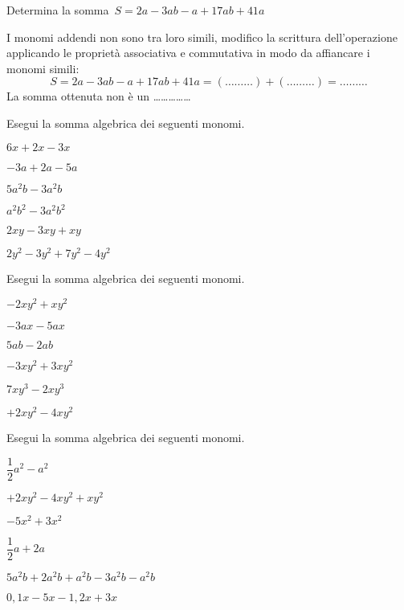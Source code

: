 \begin{esercizio}
 \label{ese:9.25}
Determina la somma~\(S=2a-3ab-a+17ab+41a\)

I monomi addendi non sono tra loro simili, modifico la scrittura
dell'operazione applicando le proprietà associativa e commutativa
in modo da affiancare i monomi simili:
\[
S=2a-3ab-a+17ab+41a=(\ldots\ldots\ldots)+(\ldots\ldots\ldots)=\ldots\ldots\ldots
\]
La somma ottenuta non è un \ldots\ldots\ldots\ldots\ldots
\end{esercizio}

\begin{esercizio}
 \label{ese:9.26}
Esegui la somma algebrica dei seguenti monomi.
\begin{multicols}{3}
\begin{enumeratea}
 \item \(6x+2x-3x\)
 \item \(-3a+2a-5a\)
 \item \(5a^{2}b-3a^{2}b\)
 \item \(a^{2}b^{2}-3a^{2}b^{2}\)
 \item \(2xy-3xy+xy\)
 \item \(2y^{2}-3y^{2}+7y^{2}-4y^{2}\)
\end{enumeratea}
\end{multicols}
\end{esercizio}

\begin{esercizio}
 \label{ese:9.27}
Esegui la somma algebrica dei seguenti monomi.
\begin{multicols}{3}
\begin{enumeratea}
 \item \(-2xy^{2}+xy^{2}\)
 \item \(-3ax-5ax\)
 \item \(5ab-2ab\)
 \item \(-3xy^{2}+3xy^{2}\)
 \item \(7xy^{3}-2xy^{3}\)
 \item \(+2xy^{2}-4xy^{2}\)
\end{enumeratea}
\end{multicols}
\end{esercizio}

\begin{esercizio}
 \label{ese:9.28}
Esegui la somma algebrica dei seguenti monomi.
\begin{multicols}{2}
\begin{enumeratea}
 \item \(\dfrac{1}{2}a^{2}-a^{2}\)
 \item \(+2xy^{2}-4xy^{2}+xy^{2}\)
 \item \(-5x^{2}+3x^{2}\)
 \item \(\dfrac{1}{2}a+2a\)
 \item \(5a^{2}b+2a^{2}b+a^{2}b-3a^{2}b-a^{2}b\)
 \item \(0,1x-5x-1,2x+3x\)
\end{enumeratea}
\end{multicols}
\end{esercizio}

